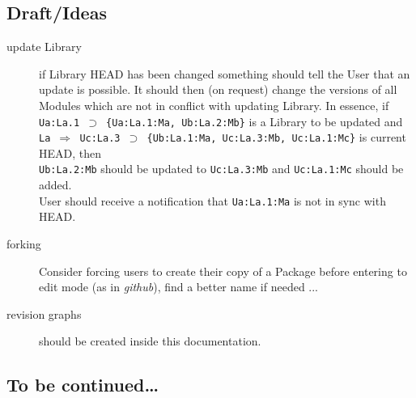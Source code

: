 \documentclass[10pt]{article}
\def\headsto{${\Longrightarrow}$ }
\def\hto{\headsto}
\def\eq{${\supset}$ }
\begin{document}
	\subsection*{Draft/Ideas}
	\begin{description}
		\item[update Library] if Library HEAD has been changed something should tell the User that an update is possible. It should then (on request) change the versions of all Modules which are not in conflict with updating Library. In essence, if \\
			{\tt Ua:La.1 \eq \{Ua:La.1:Ma, Ub:La.2:Mb\}} is a Library to be updated and \\
			{\tt La \hto Uc:La.3 \eq \{Ub:La.1:Ma, Uc:La.3:Mb, Uc:La.1:Mc\}} is current HEAD, then\\
			{\tt Ub:La.2:Mb} should be updated to {\tt Uc:La.3:Mb} and {\tt Uc:La.1:Mc} should be added.\\
			User should receive a notification that {\tt Ua:La.1:Ma} is not in sync with HEAD.
		\item[forking] Consider forcing users to create their copy of a Package before entering to edit mode (as in {\em github}), find a better name if needed ...
		\item[revision graphs] should be created inside this documentation.
	\end{description}

	\subsection*{To be continued\ldots}
\end{document}
